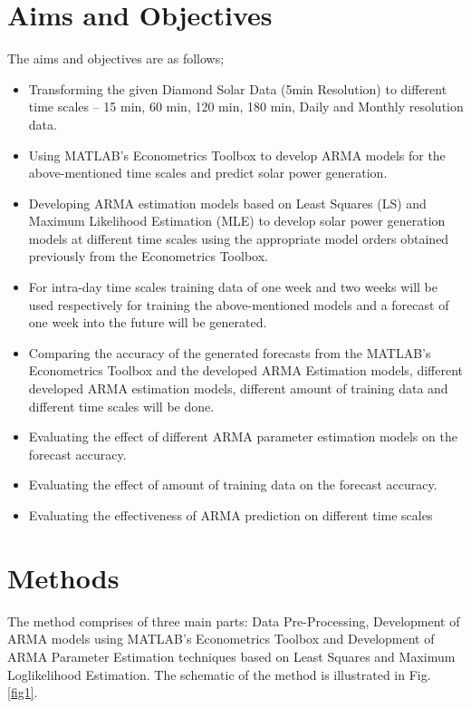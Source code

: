 \documentclass[journal]{IEEEtran}
\begin{document}
\section{Aims and Objectives}

The aims and objectives are as follows;



\begin{itemize}
  \item Transforming the given Diamond Solar Data (5min Resolution) to different time scales – 15 min, 60 min, 120 min, 180 min, Daily and Monthly resolution data.
  \item Using MATLAB’s Econometrics Toolbox to develop ARMA models for the above-mentioned time scales and predict solar power generation.

  \item Developing ARMA estimation models based on Least Squares (LS) and Maximum Likelihood Estimation (MLE) to develop solar power generation models at different time scales using the appropriate model orders obtained previously from the Econometrics Toolbox.
  \item For intra-day time scales training data of one week and two weeks will be used respectively for training the above-mentioned models and a forecast of one week into the future will be generated. 
  \item Comparing the accuracy of the generated forecasts from the MATLAB’s Econometrics Toolbox and the developed ARMA Estimation models, different developed ARMA estimation models, different amount of training data and different time scales will be done.
  \item Evaluating the effect of different ARMA parameter estimation models on the forecast accuracy.
  \item Evaluating the effect of amount of training data on the forecast accuracy.
  \item Evaluating the effectiveness of ARMA prediction on different time scales
  
   
\end{itemize}




\section{Methods}

The method comprises of three main parts:  Data Pre-Processing, Development of ARMA models using MATLAB's Econometrics Toolbox and Development of ARMA Parameter Estimation techniques based on Least Squares and Maximum Loglikelihood Estimation. The schematic of the method is illustrated in Fig. \ref{fig1}.
\end{document}
